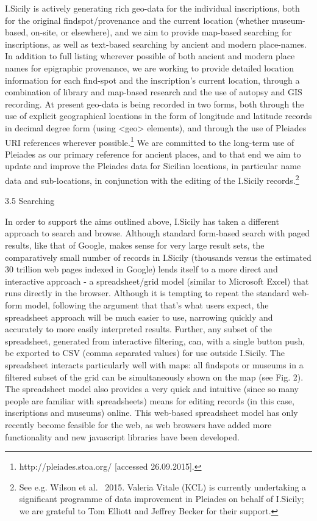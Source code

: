 \documentclass[amsthm,ebook]{saparticle}
\begin{document}
I.Sicily is actively generating rich geo-data for the individual inscriptions, both for the original findspot/provenance
and the current location (whether museum-based, on-site, or elsewhere), and we aim to provide map-based searching for
inscriptions, as well as text-based searching by ancient and modern place-names. In addition to full listing wherever
possible of both ancient and modern place names for epigraphic provenance, we are working to provide detailed location
information for each find-spot and the inscription’s current location, through a combination of library and map-based
research and the use of autopsy and GIS recording. At present geo-data is being recorded in two forms, both through the
use of explicit geographical locations in the form of longitude and latitude records in decimal degree form (using
{\textless}geo{\textgreater} elements), and through the use of Pleiades URI references wherever possible.\footnote{
http://pleiades.stoa.org/ [accessed 26.09.2015].} We are committed to the long-term use of Pleiades as our primary
reference for ancient places, and to that end we aim to update and improve the Pleiades data for Sicilian locations, in
particular name data and sub-locations, in conjunction with the editing of the I.Sicily records.\footnote{ See e.g.
Wilson et al. \ 2015. Valeria Vitale (KCL) is currently undertaking a significant programme of data improvement in
Pleiades on behalf of I.Sicily; we are grateful to Tom Elliott and Jeffrey Becker for their support.}


\bigskip

3.5 Searching

In order to support the aims outlined above, I.Sicily has taken a different approach to search and browse. Although
standard form-based search with paged results, like that of Google, makes sense for very large result sets, the
comparatively small number of records in I.Sicily (thousands versus the estimated 30 trillion web pages indexed in
Google) lends itself to a more direct and interactive approach - a spreadsheet/grid model (similar to Microsoft Excel)
that runs directly in the browser. Although it is tempting to repeat the standard web-form model, following the
argument that that’s what users expect, the spreadsheet approach will be much easier to use, narrowing quickly and
accurately to more easily interpreted results. Further, any subset of the spreadsheet, generated from interactive
filtering, can, with a single button push, be exported to CSV (comma separated values) for use outside I.Sicily. The
spreadsheet interacts particularly well with maps: all findspots or museums in a filtered subset of the grid can be
simultaneously shown on the map (see Fig. 2). The spreadsheet model also provides a very quick and intuitive (since so
many people are familiar with spreadsheets) means for editing records (in this case, inscriptions and museums) online.
This web-based spreadsheet model has only recently become feasible for the web, as web browsers have added more
functionality and new javascript libraries have been developed.
\end{document}
